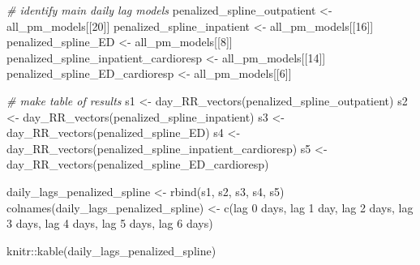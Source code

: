 \documentclass[
]{article}
\newenvironment{Shaded}{\begin{snugshade}}{\end{snugshade}}
\newcommand{\CommentTok}[1]{\textcolor[rgb]{0.56,0.35,0.01}{\textit{#1}}}
\newcommand{\DecValTok}[1]{\textcolor[rgb]{0.00,0.00,0.81}{#1}}
\newcommand{\FunctionTok}[1]{\textcolor[rgb]{0.00,0.00,0.00}{#1}}
\newcommand{\NormalTok}[1]{#1}
\newcommand{\OtherTok}[1]{\textcolor[rgb]{0.56,0.35,0.01}{#1}}
\newcommand{\SpecialCharTok}[1]{\textcolor[rgb]{0.00,0.00,0.00}{#1}}
\newcommand{\StringTok}[1]{\textcolor[rgb]{0.31,0.60,0.02}{#1}}
\begin{document}
\begin{Shaded}
\begin{Highlighting}[]
\CommentTok{\# identify main daily lag models}
\NormalTok{penalized\_spline\_outpatient }\OtherTok{\textless{}{-}}\NormalTok{ all\_pm\_models[[}\DecValTok{20}\NormalTok{]]}
\NormalTok{penalized\_spline\_inpatient }\OtherTok{\textless{}{-}}\NormalTok{ all\_pm\_models[[}\DecValTok{16}\NormalTok{]]}
\NormalTok{penalized\_spline\_ED }\OtherTok{\textless{}{-}}\NormalTok{ all\_pm\_models[[}\DecValTok{8}\NormalTok{]]}
\NormalTok{penalized\_spline\_inpatient\_cardioresp }\OtherTok{\textless{}{-}}\NormalTok{ all\_pm\_models[[}\DecValTok{14}\NormalTok{]]}
\NormalTok{penalized\_spline\_ED\_cardioresp }\OtherTok{\textless{}{-}}\NormalTok{ all\_pm\_models[[}\DecValTok{6}\NormalTok{]]}

\CommentTok{\# make table of results}
\NormalTok{s1 }\OtherTok{\textless{}{-}} \FunctionTok{day\_RR\_vectors}\NormalTok{(penalized\_spline\_outpatient)}
\NormalTok{s2 }\OtherTok{\textless{}{-}} \FunctionTok{day\_RR\_vectors}\NormalTok{(penalized\_spline\_inpatient)}
\NormalTok{s3 }\OtherTok{\textless{}{-}} \FunctionTok{day\_RR\_vectors}\NormalTok{(penalized\_spline\_ED)}
\NormalTok{s4 }\OtherTok{\textless{}{-}} \FunctionTok{day\_RR\_vectors}\NormalTok{(penalized\_spline\_inpatient\_cardioresp)}
\NormalTok{s5 }\OtherTok{\textless{}{-}} \FunctionTok{day\_RR\_vectors}\NormalTok{(penalized\_spline\_ED\_cardioresp)}

\NormalTok{daily\_lags\_penalized\_spline }\OtherTok{\textless{}{-}} \FunctionTok{rbind}\NormalTok{(s1, s2, s3, s4, s5)}
\FunctionTok{colnames}\NormalTok{(daily\_lags\_penalized\_spline) }\OtherTok{\textless{}{-}}
  \FunctionTok{c}\NormalTok{(}\StringTok{\textquotesingle{}lag 0 days\textquotesingle{}}\NormalTok{, }\StringTok{\textquotesingle{}lag 1 day\textquotesingle{}}\NormalTok{, }\StringTok{\textquotesingle{}lag 2 days\textquotesingle{}}\NormalTok{, }\StringTok{\textquotesingle{}lag 3 days\textquotesingle{}}\NormalTok{,}
    \StringTok{\textquotesingle{}lag 4 days\textquotesingle{}}\NormalTok{, }\StringTok{\textquotesingle{}lag 5 days\textquotesingle{}}\NormalTok{, }\StringTok{\textquotesingle{}lag 6 days\textquotesingle{}}\NormalTok{)}

\NormalTok{knitr}\SpecialCharTok{::}\FunctionTok{kable}\NormalTok{(daily\_lags\_penalized\_spline)}
\end{Highlighting}
\end{Shaded}
\end{document}
